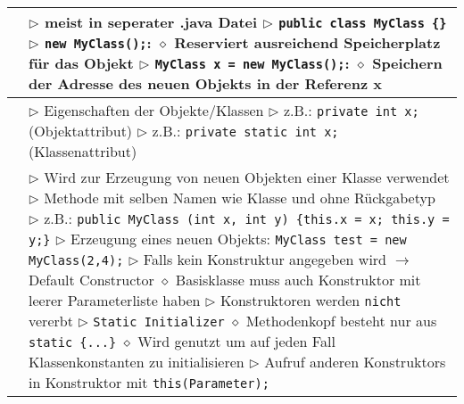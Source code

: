 	\begin{tabular}{ | p{4cm} p{13.5cm} | }
	\hline
	\makecell[l]{Erzeugung} & \makecell[l]{$\rhd$ meist in seperater .java Datei  \\
	$\rhd$ \texttt{public class MyClass \{\}} \\
	$\rhd$ \texttt{new MyClass();}: \\
	\hspace{0.4cm} $\diamond$ Reserviert ausreichend Speicherplatz für das Objekt \\ 
	$\rhd$ \texttt{MyClass x = new MyClass();}: \\
	\hspace{0.4cm} $\diamond$ Speichern der Adresse des neuen Objekts in der Referenz x } \\ \hline
	
	\makecell[l]{Attribute} & \makecell[l]{$\rhd$ Eigenschaften der Objekte/Klassen \\
	$\rhd$ z.B.: \texttt{private int x;} (Objektattribut) \\
	$\rhd$ z.B.: \texttt{private static int x;} (Klassenattribut)  } \\ \hline
	
	\makecell[l]{Konstruktor} & 
	\makecell[l]{$\rhd$ Wird zur Erzeugung von neuen Objekten einer Klasse verwendet \\
	$\rhd$ Methode mit selben Namen wie Klasse und ohne Rückgabetyp \\
	$\rhd$ z.B.: \texttt{public MyClass (int x, int y) \{this.x = x; this.y = y;\}} \\
	$\rhd$ Erzeugung eines neuen Objekts: \texttt{MyClass test = new MyClass(2,4);} \\
	$\rhd$ Falls kein Konstruktur angegeben wird $\rightarrow$ Default Constructor \\
	\hspace{0.4cm} $\diamond$ Basisklasse muss auch Konstruktor mit leerer Parameterliste haben \\
	$\rhd$ Konstruktoren werden \texttt{nicht} vererbt \\
	$\rhd$ \texttt{Static Initializer} \\
	\hspace{0.4cm} $\diamond$ Methodenkopf besteht nur aus \texttt{static \{...\}} \\
	\hspace{0.4cm} $\diamond$ Wird genutzt um auf jeden Fall Klassenkonstanten zu initialisieren \\
	$\rhd$ Aufruf anderen Konstruktors in Konstruktor mit \texttt{this(Parameter);}} \\ \hline


\end{tabular}
